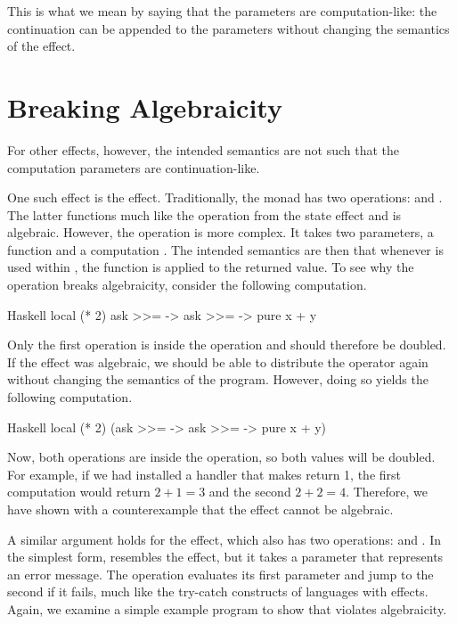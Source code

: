 This is what we mean by saying that the parameters are computation-like: the continuation can be appended to the parameters without changing the semantics of the effect.

\section{Breaking Algebraicity}

For other effects, however, the intended semantics are not such that the computation parameters are continuation-like.

One such effect is the  effect. Traditionally, the  monad has two operations:  and . The latter functions much like the  operation from the state effect and is algebraic. However, the  operation is more complex. It takes two parameters, a function  and a computation . The intended semantics are then that whenever  is used within , the function  is applied to the returned value. To see why the  operation breaks algebraicity, consider the following computation.

\begin{lst}{Haskell}
local (* 2) ask >>= \x -> ask >>= \y -> pure x + y
\end{lst}
%
Only the first  operation is inside the  operation and should therefore be doubled. If the  effect was algebraic, we should be able to distribute the \hs{>>=} operator again without changing the semantics of the program. However, doing so yields the following computation.

\begin{lst}{Haskell}
local (* 2) (ask >>= \x -> ask >>= \y -> pure x + y)
\end{lst}
%
Now, both  operations are inside the  operation, so both values will be doubled. For example, if we had installed a handler that makes  return 1, the first computation would return $2 + 1 = 3$ and the second $2 + 2 = 4$. Therefore, we have shown with a counterexample that the  effect cannot be algebraic.

A similar argument holds for the  effect, which also has two operations:  and . In the simplest form,  resembles the  effect, but it takes a parameter that represents an error message. The  operation evaluates its first parameter and jump to the second if it fails, much like the try-catch constructs of languages with effects. Again, we examine a simple example program to show that  violates algebraicity.

